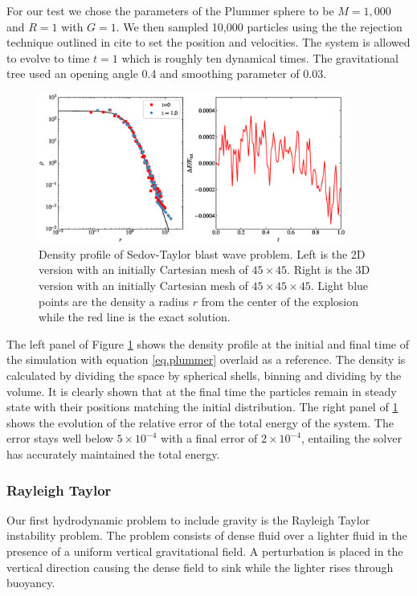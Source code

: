 For our test we chose the parameters of the Plummer sphere to be $M=1,000$ and $R=1$ with
$G=1$. We then sampled 10,000 particles using the the rejection technique outlined in
cite to set the position and velocities. The system is allowed to evolve to time $t=1$
which is roughly ten dynamical times. The gravitational tree used an opening angle 0.4
and smoothing parameter of 0.03.
\begin{figure}
    \begin{center}
        \includegraphics[width=0.9\textwidth]{figures/plummer.eps}
        \caption{Density profile of Sedov-Taylor blast wave problem. Left is the 2D version with an initially
        Cartesian mesh of $45 \times 45$. Right is the 3D version with an initially Cartesian mesh of 
        $45 \times 45 \times 45$. Light blue points are the density a radius $r$ from the center of the explosion
        while the red line is the exact solution.}
        \label{fig.plummer}
    \end{center}
\end{figure}
The left panel of Figure \ref{fig.plummer} shows the density profile at the initial and final 
time of the simulation with equation \ref{eq.plummer} overlaid as a reference. The density is calculated
by dividing the space by spherical shells, binning and dividing by the volume. It is clearly shown that
at the final time the particles remain in steady state with their positions matching the initial
distribution. The right panel of \ref{fig.plummer} shows the evolution of the relative error of the
total energy of the system. The error stays well below $5\times 10^{-4}$ with a final error of
$2\times 10^{-4}$, entailing the solver has accurately maintained the total energy.

\subsubsection{Rayleigh Taylor}
Our first hydrodynamic problem to include gravity is the Rayleigh Taylor instability problem.
The problem consists of dense fluid over a lighter fluid in the presence of a uniform 
vertical gravitational field. A perturbation is placed in the vertical direction causing the
dense field to sink while the lighter rises through buoyancy.

